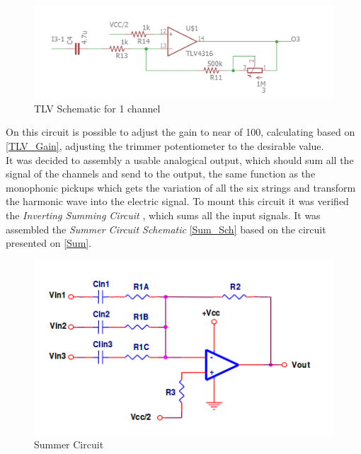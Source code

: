 \begin{figure}[!htpb]
\centering
\caption{TLV Schematic for 1 channel}
\label{TLV_Sch}
\includegraphics[scale=0.4]{images/TLV_1ch}
\end{figure}

On this circuit is possible to adjust the gain to near of 100, calculating based on \autoref{TLV_Gain}, adjusting the trimmer potentiometer to the desirable value.\\

It was decided to assembly a usable analogical output, which should sum all the signal of the channels and send to the output, the same function as the monophonic pickups which gets
the variation of all the six strings and transform the harmonic wave into the electric signal. To mount this circuit it was verified the \textit{Inverting Summing Circuit} \cite{OpAmps},
which sums all the input signals. It was assembled the \textit{Summer Circuit Schematic} \autoref{Sum_Sch} based on the circuit presented on \autoref{Sum}.

\begin{figure}[!htpb]
\centering
\caption{Summer Circuit}
\label{Sum}
\includegraphics[scale=0.9]{images/sum}
\end{figure}

